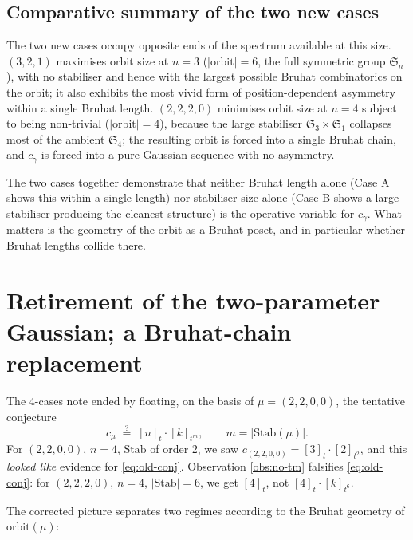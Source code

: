 \documentclass[11pt]{article}
\theoremstyle{definition}
\theoremstyle{remark}
\newcommand{\Sn}{\mathfrak{S}_n}
\newcommand{\qint}[1]{[#1]_t}
\begin{document}
\subsection{Comparative summary of the two new cases}

The two new cases occupy opposite ends of the spectrum available
at this size. $(3,2,1)$ maximises orbit size at $n = 3$
($|\mathrm{orbit}| = 6$, the full symmetric group $\Sn$), with
no stabiliser and hence with the largest possible Bruhat
combinatorics on the orbit; it also exhibits the most vivid
form of position-dependent asymmetry within a single Bruhat
length. $(2,2,2,0)$ minimises orbit size at $n = 4$ subject to
being non-trivial ($|\mathrm{orbit}| = 4$), because the large
stabiliser $\mathfrak{S}_3 \times \mathfrak{S}_1$ collapses most
of the ambient $\mathfrak{S}_4$; the resulting orbit is forced
into a single Bruhat chain, and $c_\gamma$ is forced into a
pure Gaussian sequence with no asymmetry.

The two cases together demonstrate that neither Bruhat length
alone (Case A shows this within a single length) nor stabiliser
size alone (Case B shows a large stabiliser producing the
cleanest structure) is the operative variable for $c_\gamma$.
What matters is the geometry of the orbit as a Bruhat poset, and
in particular whether Bruhat lengths collide there.

\section{Retirement of the two-parameter Gaussian; a Bruhat-chain
         replacement}

The 4-cases note ended by floating, on the basis of
$\mu = (2,2,0,0)$, the tentative conjecture
\begin{equation}\label{eq:old-conj}
   c_\mu \;\stackrel{?}{=}\; \qint{n} \cdot [k]_{t^m},
   \qquad m = |\mathrm{Stab}(\mu)|.
\end{equation}
For $(2,2,0,0)$, $n=4$, $\mathrm{Stab}$ of order $2$, we saw
$c_{(2,2,0,0)} = \qint{3} \cdot [2]_{t^2}$, and this
\emph{looked like} evidence for \eqref{eq:old-conj}. Observation
\ref{obs:no-tm} falsifies \eqref{eq:old-conj}: for
$(2,2,2,0)$, $n=4$, $|\mathrm{Stab}| = 6$, we get $\qint{4}$,
not $\qint{4} \cdot [k]_{t^6}$.

The corrected picture separates two regimes according to the
Bruhat geometry of $\mathrm{orbit}(\mu)$:
\end{document}
